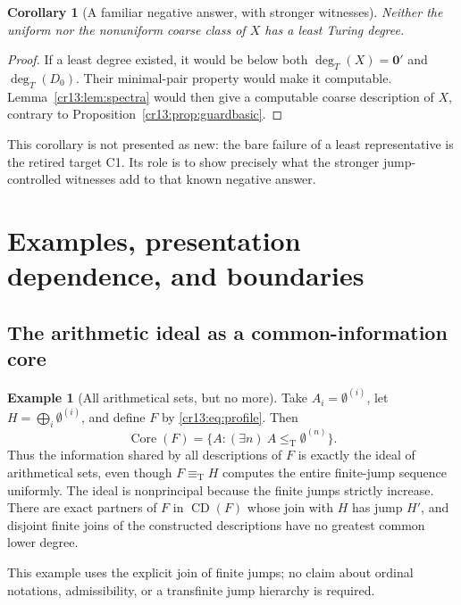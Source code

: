 \documentclass[11pt,letterpaper]{article}
\newtheorem{corollary}[theorem]{Corollary}
\theoremstyle{definition}
\newtheorem{example}[theorem]{Example}
\theoremstyle{remark}\newtheorem{remark}[theorem]{Remark}
\numberwithin{equation}{section}
\newcommand{\leT}{\leq_{\mathrm T}}
\newcommand{\eqT}{\equiv_{\mathrm T}}
\newcommand{\Core}{\operatorname{Core}}
\newcommand{\CD}{\operatorname{CD}}
\newcommand{\zero}{\mathbf 0}
\begin{document}
\begin{corollary}[A familiar negative answer, with stronger witnesses]\label{cr13:cor:noleastX}
Neither the uniform nor the nonuniform coarse class of $X$ has a least Turing degree.
\end{corollary}
\begin{proof}
If a least degree existed, it would be below both $\deg_T(X)=\zero'$ and $\deg_T(D_0)$. Their minimal-pair property would make it computable. Lemma~\ref{cr13:lem:spectra} would then give a computable coarse description of $X$, contrary to Proposition~\ref{cr13:prop:guardbasic}.
\end{proof}
This corollary is not presented as new: the bare failure of a least representative is the retired target C1. Its role is to show precisely what the stronger jump-controlled witnesses add to that known negative answer.

\section{Examples, presentation dependence, and boundaries}
\label{cr13:sec:examples}
\subsection{The arithmetic ideal as a common-information core}
\begin{example}[All arithmetical sets, but no more]
Take $A_i=\emptyset^{(i)}$, let $H=\bigoplus_i\emptyset^{(i)}$, and define $F$ by \eqref{cr13:eq:profile}. Then
\[
              \Core(F)=\{A:(\exists n)\ A\leT\emptyset^{(n)}\}.
\]
Thus the information shared by all descriptions of $F$ is exactly the ideal of arithmetical sets, even though $F\eqT H$ computes the entire finite-jump sequence uniformly. The ideal is nonprincipal because the finite jumps strictly increase. There are exact partners of $F$ in $\CD(F)$ whose join with $H$ has jump $H'$, and disjoint finite joins of the constructed descriptions have no greatest common lower degree.
\end{example}
This example uses the explicit join of finite jumps; no claim about ordinal notations, admissibility, or a transfinite jump hierarchy is required.
\end{document}
